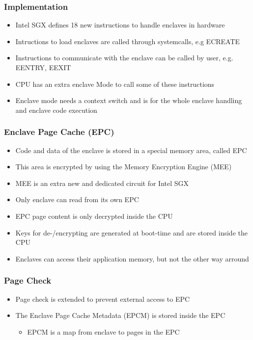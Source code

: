 \begin{frame}
    \frametitle{Implementation}
    \begin{itemize}[<+->]
        \item Intel SGX defines 18 new instructions to handle enclaves in hardware
        \item Intructions to load enclaves are called through systemcalls, e.g ECREATE
        \item Instructions to communicate with the enclave can be called by user, e.g. EENTRY, EEXIT
        \item CPU has an extra enclave Mode to call some of these instructions
        \item Enclave mode needs a context switch and is for the whole enclave handling and enclave code execution
    \end{itemize}
\end{frame}

\begin{frame}
    \frametitle{Enclave Page Cache (EPC)}
    \begin{itemize}[<+->]
        \item Code and data of the enclave is stored in a special memory area, called EPC
        \item This area is encrypted by using the Memory Encryption Engine (MEE)
        \item MEE is an extra new and dedicated circuit for Intel SGX
        \item Only enclave can read from its own EPC
        \item EPC page content is only decrypted inside the CPU
        \item Keys for de-/encrypting are generated at boot-time and are stored inside the CPU
        \item Enclaves can access their application memory, but not the other way arround
    \end{itemize}
\end{frame}

\begin{frame}
    \frametitle{Page Check}
    \begin{itemize}[<+->]
        \item Page check is extended to prevent external access to EPC
        \item The Enclave Page Cache Metadata (EPCM) is stored inside the EPC
        \begin{itemize}[<+->]
            \item EPCM is a map from enclave to pages in the EPC
        \end{itemize}
    \end{itemize}
\end{frame}

